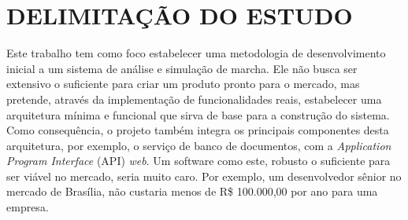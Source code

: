 \section[DELIMITAÇÃO DO ESTUDO]{DELIMITAÇÃO DO ESTUDO}

Este trabalho tem como foco estabelecer uma metodologia de desenvolvimento inicial a um sistema de análise e simulação de marcha. 
Ele não busca ser extensivo o suficiente para criar um produto pronto para o mercado, mas pretende, através da implementação de funcionalidades reais, estabelecer uma arquitetura mínima e funcional que sirva de base para a construção do sistema. 
Como consequência, o projeto também integra os principais componentes desta arquitetura, por exemplo, o serviço de banco de documentos, com a \emph{Application Program Interface} (API) \emph{web}.
Um software como este, robusto o suficiente para ser viável no mercado, seria muito caro. 
Por exemplo, um desenvolvedor sênior no mercado de Brasília, não custaria menos de R\$ 100.000,00 por ano para uma empresa. 

